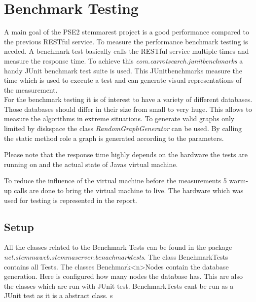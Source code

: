 \documentclass[11pt,fleqn,openany]{book} %
\begin{document}


\chapter{Benchmark Testing}

A main goal of the PSE2 stemmarest project is a good performance compared to the previous RESTful service. To measure the performance benchmark testing is needed. A benchmark test basically calls the RESTful service multiple times and measure the response time. To achieve this \textit{com.carrotsearch.junitbenchmarks} a handy JUnit benchmark test suite is used. This JUnitbenchmarks measure the time which is used to execute a test and can generate visual representations of the measurement.\\
For the benchmark testing it is of interest to have a variety of different databases. Those databases should differ in their size from small to very huge. This allows to measure the algorithms in extreme situations.
To generate valid graphs only limited by diskspace the class \textit{RandomGraphGenerator} can be used. By calling the static method role a graph is generated according to the parameters.\\
\begin{remark}
Please note that the response time highly depends on the hardware the tests are running on and the actual state of Javas virtual machine. 
\end{remark}
To reduce the influence of the virtual machine before the measurements 5 warm-up calls are done to bring the virtual machine to live. The hardware which was used for testing is represented in the report.

\section*{Setup}
All the classes related to the Benchmark Tests can be found in the package \\ \textit{net.stemmaweb.stemmaserver.benachmarktests}. The class BenchmarkTests contains all Tests. The classes Benchmark<n>Nodes contain the database generation. Here is configured how many nodes the database has. This are also the classes which are run with JUnit test. BenchmarkTests cant be run as a JUnit test as it is a abstract class. s
\end{document}
